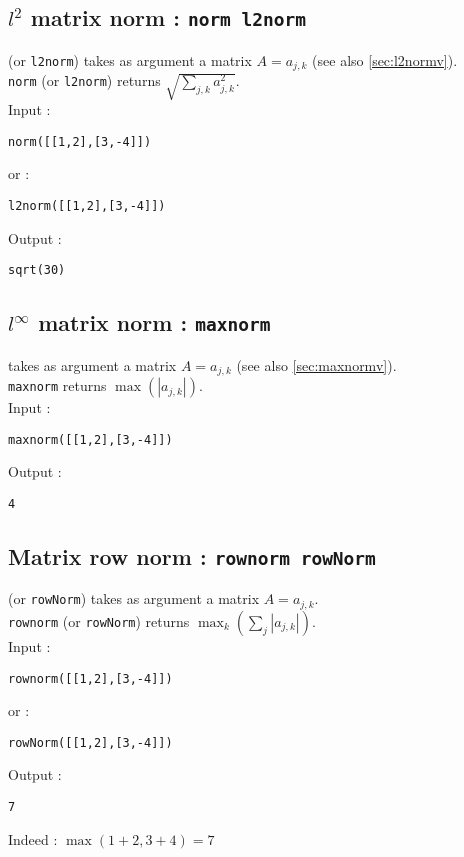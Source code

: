 \documentclass[a4paper,11pt]{book}
\begin{document}
\subsection{$l^2$ matrix norm : {\tt norm l2norm}}\label{sec:l2normm}
 (or {\tt l2norm}) takes as argument a matrix $A=a_{j,k}$ 
(see also \ref{sec:l2normv}).\\
{\tt norm} (or {\tt l2norm}) returns 
$\displaystyle \sqrt{\sum_{j,k} a_{j,k}^2}$.\\
Input :
\begin{center}{\tt norm([[1,2],[3,-4]])}\end{center}
or :
\begin{center}{\tt l2norm([[1,2],[3,-4]])}\end{center}
Output :
\begin{center}{\tt sqrt(30)}\end{center}

\subsection{$l^\infty$ matrix norm : {\tt maxnorm}}\label{sec:maxnormm}
 takes as argument a matrix $A=a_{j,k}$ (see also \ref{sec:maxnormv}).\\
{\tt maxnorm} returns $ \max(|a_{j,k}|)$.\\
Input :
\begin{center}{\tt maxnorm([[1,2],[3,-4]])}\end{center}
Output :
\begin{center}{\tt 4}\end{center}

\subsection{Matrix row norm : {\tt rownorm rowNorm}}
 (or {\tt rowNorm}) takes as argument a matrix $A=a_{j,k}$.\\
{\tt rownorm} (or {\tt rowNorm}) returns $\max_k(\sum_j |a_{j,k}|)$.\\
Input :
\begin{center}{\tt rownorm([[1,2],[3,-4]])}\end{center}
or :
\begin{center}{\tt rowNorm([[1,2],[3,-4]])}\end{center}
Output :
\begin{center}{\tt 7}\end{center}
Indeed : $\max(1+2,3+4)=7$
\end{document}
